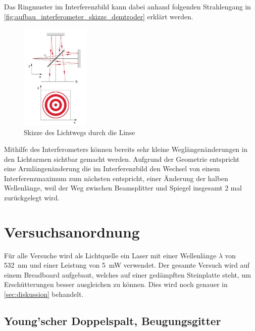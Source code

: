 \documentclass[12pt,english,ngerman]{scrartcl}
\begin{document}
Das Ringmuster im Interferenzbild kann dabei anhand folgenden Strahlengang in
\autoref{fig:aufbau_interferometer_skizze_demtroder} erklärt
werden.\cite{unterlagen}

\begin{figure}[H]
	\begin{center}
		\includegraphics[width =0.3\textwidth]{./figures/linse_demtroder.jpg}
	\end{center}
	\caption[Skizze des Lichtwegs durch die Linse] {Skizze des Lichtwegs durch die Linse
		\cite{demtroder2}
	}\label{fig:aufbau_interferometer_skizze_demtroder}
\end{figure}

Mithilfe des Interferometers können bereits sehr kleine Weglängenänderungen in
den Lichtarmen sichtbar gemacht werden. Aufgrund der Geometrie entspricht eine
Armlängenänderung die im Interferenzbild den Wechsel von einem
Interferenzmaximum zum nächsten entspricht, einer Änderung der halben
Wellenlänge, weil der Weg zwischen Beamsplitter und Spiegel insgesamt 2 mal
zurückgelegt wird.

\section{Versuchsanordnung}\label{sec:versuchsanordnung}

Für alle Versuche wird als Lichtquelle ein Laser mit einer Wellenlänge
$\lambda$ von \SI{532}{\nano\meter} und einer Leistung von \SI{5}{\milli\watt}
verwendet. Der gesamte Versuch wird auf einem Breadboard aufgebaut, welches auf
einer gedämpften Steinplatte steht, um Erschütterungen besser ausgleichen zu
können. Dies wird noch genauer in \autoref{sec:diskussion} behandelt.
\subsection{Young'scher Doppelspalt, Beugungsgitter}
\end{document}
